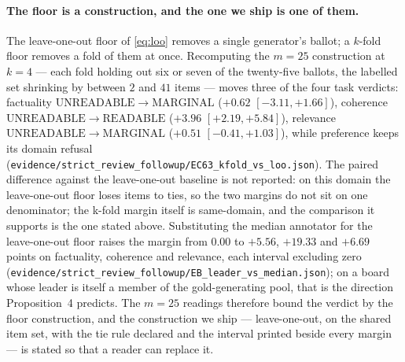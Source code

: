 \documentclass{article}
\newcommand{\ids}[1]{\texttt{\small #1}} %
\begin{document}
\paragraph{The floor is a construction, and the one we ship is one of them.} The leave-one-out floor of \eqref{eq:loo} removes a single generator's ballot; a $k$-fold floor removes a fold of them at once. Recomputing the $m=25$ construction at $k=4$ --- each fold holding out six or seven of the twenty-five ballots, the labelled set shrinking by between $2$ and $41$ items --- moves three of the four task verdicts: factuality $\mathrm{UNREADABLE} \to \mathrm{MARGINAL}$ ($+0.62$ $[-3.11, +1.66]$), coherence $\mathrm{UNREADABLE} \to \mathrm{READABLE}$ ($+3.96$ $[+2.19, +5.84]$), relevance $\mathrm{UNREADABLE} \to \mathrm{MARGINAL}$ ($+0.51$ $[-0.41, +1.03]$), while preference keeps its domain refusal (\ids{evidence/strict\_review\_followup/EC63\_kfold\_vs\_loo.json}). The paired difference against the leave-one-out baseline is not reported: on this domain the leave-one-out floor loses items to ties, so the two margins do not sit on one denominator; the k-fold margin itself is same-domain, and the comparison it supports is the one stated above. Substituting the median annotator for the leave-one-out floor raises the margin from $0.00$ to $+5.56$, $+19.33$ and $+6.69$ points on factuality, coherence and relevance, each interval excluding zero (\ids{evidence/strict\_review\_followup/EB\_leader\_vs\_median.json}); on a board whose leader is itself a member of the gold-generating pool, that is the direction Proposition~4 predicts. The $m=25$ readings therefore bound the verdict by the floor construction, and the construction we ship --- leave-one-out, on the shared item set, with the tie rule declared and the interval printed beside every margin --- is stated so that a reader can replace it.
\end{document}
